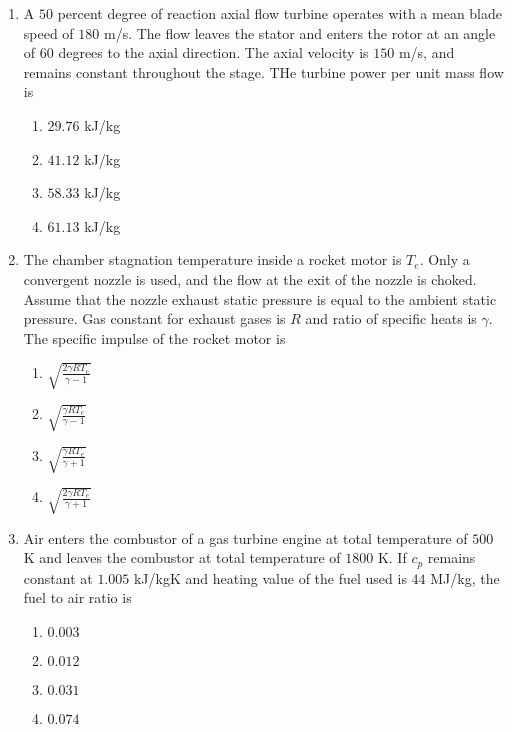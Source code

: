 \documentclass[journal,onecolumn]{IEEEtran}
\theoremstyle{remark}
\begin{document}
\begin{enumerate}
    \item A $50$ percent degree of reaction axial flow turbine operates with a mean blade speed of $180$ m/s. The flow leaves the stator and enters the rotor at an angle of $60$ degrees to the axial direction. The axial velocity is $150$ m/s, and remains constant throughout the stage. THe turbine power per unit mass flow is
	\hfill{}

	\begin{enumerate}
		\item $29.76$ kJ/kg
		\item $41.12$ kJ/kg
		\item $58.33$ kJ/kg
		\item $61.13$ kJ/kg
	\end{enumerate}


    \item The chamber stagnation temperature inside a rocket motor is $T_e$. Only a convergent nozzle is used, and the flow at the exit of the nozzle is choked. Assume that the nozzle exhaust static pressure is equal to the ambient static pressure. Gas constant for exhaust gases is $R$ and ratio of specific heats is $\gamma$. The specific impulse of the rocket motor is
	\hfill{}

	\begin{enumerate}
		\item $\sqrt{\frac{2\gamma R T_e}{\gamma - 1}}$
		\item $\sqrt{\frac{\gamma R T_e}{\gamma - 1}}$
		\item $\sqrt{\frac{\gamma R T_e}{\gamma + 1}}$
		\item $\sqrt{\frac{2\gamma R T_e}{\gamma + 1}}$
	\end{enumerate}


    \item Air enters the combustor of a gas turbine engine at total temperature of $500$ K and leaves the combustor at total temperature of $1800$ K. If $c_p$ remains constant at $1.005$ kJ/kgK and heating value of the fuel used is $44$ MJ/kg, the fuel to air ratio is
	\hfill{}

	\begin{enumerate}
		\item $0.003$
		\item $0.012$
		\item $0.031$
		\item $0.074$
	\end{enumerate}



\end{enumerate}
\end{document}
